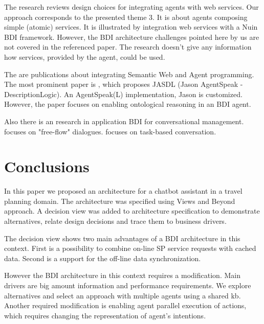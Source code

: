 \documentclass{llncs}
\begin{document}
The research \cite{dickinson2005Agents} reviews design choices for integrating agents with web services. Our approach corresponds to the presented theme 3. It is about agents composing simple (atomic) services. It is illustrated by integration web services with a Nuin \gls{BDI} framework. However, the \gls{BDI} architecture challenges pointed here by us are not covered in the referenced paper. The research doesn't give any information how services, provided by the agent, could be used.

The are publications about integrating  Semantic Web and Agent programming. The most prominent paper is \cite{klapiscak2009jasdl}, which proposes JASDL (Jason AgentSpeak - DescriptionLogic). An AgentSpeak(L) implementation, Jason \cite{bordini2007programming} is customized. However, the paper focuses on enabling ontological reasoning in an \gls{BDI} agent.

Also there is an research in application \gls{BDI} for conversational management. \cite{wong2012conversation} focuses on "free-flow" dialogues. \cite{nguyen2005agent} focuses on task-based conversation.



\section{Conclusions}
\label{sec:conclusions}
In this paper we proposed an architecture for a chatbot assistant in a travel planning domain. The architecture was specified using Views and Beyond \cite{bachmann2010documenting} approach. A decision view was added to architecture specification to demonstrate alternatives, relate design decisions and trace them to business drivers.

The decision view shows two main advantages of a \gls{BDI} architecture in this context. First is a possibility to combine on-line \gls{SP} service requests with cached data. Second is a support for the off-line data synchronization.  

However the \gls{BDI} architecture in this context requires a modification. Main drivers are big amount information and performance requirements. We explore alternatives and select an approach with multiple agents using a shared \gls{kb}. Another required modification is enabling agent parallel execution of actions, which requires changing the representation of agent's intentions.

\end{document}
